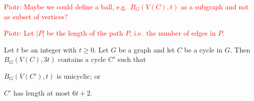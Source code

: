 \documentclass{patmorin}
\newcommand{\piotr}[1]{\textcolor{red}{Piotr: #1}}
\DeclareMathOperator{\girth}{girth}
\DeclareMathOperator{\dist}{dist}
\begin{document}
%
%
%
%
%
%
%
%
%
%
%
%
%

\piotr{Maybe we could define a ball, e.g.\ $B_G(V(C),t)$ as a subgraph and not as subset of vertices?}

\piotr{Let $|P|$ be the length of the path $P$, i.e.\ the number of edges in $P$.}

\begin{lem}\label{short_or_unicycle_nearby}
  Let $t$ be an integer with $t\ge 0$. 
  Let $G$ be a graph and let $C$ be a cycle in $G$. 
  Then $B_G(V(C),3t)$ contains a cycle $C'$ such that
  \begin{compactenum}[(a)]
    \item $B_G(V(C'),t)$ is unicyclic; or\label{short_or_unicycle_nearby:unicyclic}
    \item $C'$ has length at most $6t+2$.\label{short_or_unicycle_nearby:short}
  \end{compactenum}
\end{lem}
\end{document}
